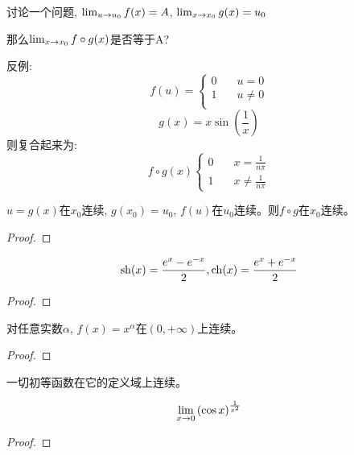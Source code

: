 讨论一个问题, $\lim_{u \to u_0 } f(x) = A$, $\lim_{x \to x_0 } g(x) = u_0$

那么$\lim_{x \to x_0 } f\circ g(x)$是否等于A?

反例:
\begin{equation*}
    f(u) = \left\{
        \begin{aligned}
            0 & \quad u = 0 \\
            1 & \quad u \neq 0 \\
        \end{aligned}
    \right.
\end{equation*}
\begin{equation*}
    g(x) = x\sin\left(\frac{1}{x}\right)
\end{equation*}
则复合起来为:
\begin{equation*}
    f\circ g(x) \left\{
        \begin{aligned}
           0 & \quad x = \frac{1}{n\pi} \\
           1 & \quad x \neq \frac{1}{n\pi} 
        \end{aligned}
    \right.
\end{equation*}
\begin{theorem}
    $u = g(x)$在$x_0$连续, $g(x_0) = u_0$, $f(u)$在$u_0$连续。则$f\circ g$在$x_0$连续。
\end{theorem}
\begin{proof}
    
\end{proof}


\begin{proposition}
    \[ \mathrm{sh}(x) = \frac{e^x-e^{-x}}{2}, \mathrm{ch}(x) = \frac{e^x+e^{-x}}{2} \]
\end{proposition}
\begin{proof}
    
\end{proof}

\begin{proposition}
    对任意实数$\alpha$, $f(x) = x^\alpha$在$(0, +\infty)$上连续。
\end{proposition}
\begin{proof}
    
\end{proof}

\begin{theorem}
    一切初等函数在它的定义域上连续。
\end{theorem}

\begin{proposition}
    \[ \lim_{x \to 0 } \left(\cos x\right)^{\frac{1}{x^2}} \]
\end{proposition}
\begin{proof}
    
\end{proof}

